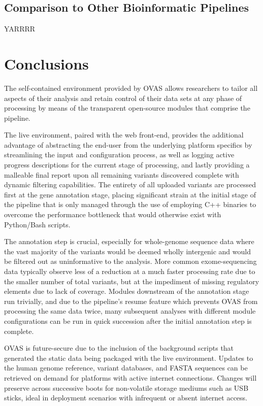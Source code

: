 \documentclass[twocolumn]{bmcart}%
\def\app{OVAS}
\begin{document}
\subsection{Comparison to Other Bioinformatic Pipelines}

YARRRR



\section*{Conclusions}

The self-contained environment provided by \app{} allows researchers to tailor all aspects of their analysis and retain control of their data sets at any phase of processing by means of the transparent open-source modules that comprise the pipeline. 

The live environment, paired with the web front-end, provides the additional advantage of abstracting the end-user from the underlying platform specifics by streamlining the input and configuration process, as well as logging active progress descriptions for the current stage of processing, and lastly providing a malleable final report upon all remaining variants discovered complete with dynamic filtering capabilities. The entirety of all uploaded variants are processed first at the gene annotation stage, placing significant strain at the initial stage of the pipeline that is only managed through the use of employing C++ binaries to overcome the performance bottleneck that would otherwise exist with Python/Bash scripts.

The annotation step is crucial, especially for whole-genome sequence data where the vast majority of the variants would be deemed wholly intergenic and would be filtered out as uninformative to the analysis. More common exome-sequencing data typically observe less of a reduction at a much faster processing rate due to the smaller number of total variants, but at the impediment of missing regulatory elements due to lack of coverage. Modules downstream of the annotation stage run trivially, and due to the pipeline's resume feature which prevents \app{} from processing the same data twice, many subsequent analyses with different module configurations can be run in quick succession after the initial annotation step is complete.

\app{} is future-secure due to the inclusion of the background scripts that generated the static data being packaged with the live environment. Updates to the human genome reference, variant databases, and FASTA sequences can be retrieved on demand for platforms with active internet connections. Changes will preserve across successive boots for non-volatile storage mediums such as USB sticks, ideal in deployment scenarios with infrequent or absent internet access.
\end{document}
